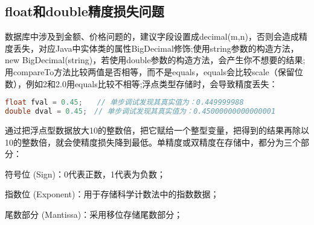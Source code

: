 \documentclass[../../../interview-questions.tex]{subfiles}
\begin{document}
\subsection{float和double精度损失问题}

数据库中涉及到金额、价格问题的，建议字段设置成decimal(m,n)，否则会造成精度丢失，对应Java中实体类的属性BigDecimal修饰;使用string参数的构造方法，new  BigDecimal(string)，若使用double参数的构造方法，会产生你不想要的结果;用compareTo方法比较两值是否相等，而不是equals，equals会比较scale（保留位数），例如2和2.0用equals比较不相等;浮点类型存储时，会导致精度丢失：

\begin{lstlisting}[language=Java]
float fval = 0.45;　　// 单步调试发现其真实值为：0.449999988
double dval = 0.45;　// 单步调试发现其真实值为：0.45000000000000001
\end{lstlisting}

通过把浮点型数据放大10的整数倍，把它赋给一个整型变量，把得到的结果再除以10的整数倍，就会使精度损失降到最低。单精度或双精度在存储中，都分为三个部分：

符号位 (Sign)：0代表正数，1代表为负数；

指数位 (Exponent)：用于存储科学计数法中的指数数据；

尾数部分 (Mantissa)：采用移位存储尾数部分；
\end{document}
